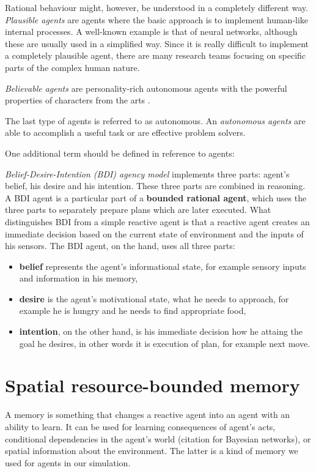 Rational behaviour might, however, be understood in a completely different way. \emph{Plausible agents} are agents where the basic approach is to implement human-like internal processes. A well-known example is that of neural networks, although these are usually used in a simplified way. Since it is really difficult to implement a completely plausible agent, there are many research teams focusing on specific parts of the complex human nature.

\emph{Believable agents} are personality-rich autonomous agents with the powerful properties of characters from the arts \cite{Loyall:believableagents}. 

The last type of agents is referred to as autonomous. An \emph{autonomous agents} are able to accomplish a useful task or are effective problem solvers.

One additional term should be defined in reference to agents:

\textit{Belief-Desire-Intention (BDI) agency model} implements three parts: agent's belief, his desire and his intention. These three parts are combined in reasoning. A BDI agent is a particular part of a \textbf{bounded rational agent}, which uses the three parts to separately prepare plans which are later executed. What distinguishes BDI from a simple reactive agent is that a reactive agent creates an immediate decision based on the current state of environment and the inputs of his sensors. The BDI agent, on the hand, uses all three parts:

\begin{itemize}
\item {\bf belief} represents the agent's informational state, for example sensory inputs and information in his memory,
\item {\bf desire} is the agent's motivational state, what he needs to approach, for example he is hungry and he needs to find appropriate food,
\item {\bf intention}, on the other hand, is his immediate decision how he attaing the goal he desires, in other words it is execution of plan, for example next move.
\end{itemize}

\section{Spatial resource-bounded memory}

A memory is something that changes a reactive agent into an agent with an ability to learn. It can be used for learning consequences of agent's acts, conditional dependencies in the agent's world (citation for Bayesian networks), or spatial information about the environment. The latter is a kind of memory we used for agents in our simulation. 


